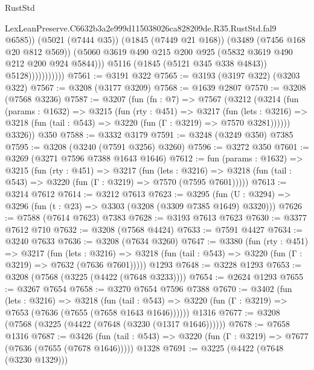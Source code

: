 \begin{lexlean}{RustStd}
\begin{coremodule}
                                LexLeanPreserve.C6632b3a2e999d115038026ca828209de.R35.RustStd.fal9
                                @6585))
                            (@5021 (@7444 @35))
                            (@1845 (@7449 @21 @168))
                            (@3489 (@7456 @168 @20 @812 @569))
                            (@5060
                              @3619
                              @490
                              @215
                              @200
                              @925
                              (@5832 @3619 @490 @212 @200 @924 @5844)))
                          @5116
                          (@1845 (@5121 @345 @338 @4843))
                          @5128)))))))))))
@7561 := @3191 @322
@7565 := @3193 (@3197 @322) (@3203 @322)
@7567 := @3208 (@3177 @3209)
@7568 := @1639 @2807
@7570 := @3208 (@7568 @3236)
@7587 := @3207
    (fun (fn : @7) =>
    @7567
      (@3212
        (@3214
          (fun (params : @1632) =>
          @3215
            (fun (rty : @451) =>
            @3217
              (fun (lets : @3216) =>
              @3218 (fun (tail : @543) => @3220 (fun (Γ : @3219) => @7570 @3281))))))
        @3326))
    @350
@7588 := @3332 @3179
@7591 := @3248 (@3249 @350) @7385
@7595 := @3208 (@3240 (@7591 @3256) @3260)
@7596 := @3272 @350
@7601 := @3269 (@3271 @7596 @7388 @1643 @1646)
@7612 := fun (params : @1632) =>
  @3215
    (fun (rty : @451) =>
    @3217
      (fun (lets : @3216) =>
      @3218 (fun (tail : @543) => @3220 (fun (Γ : @3219) => @7570 (@7595 @7601)))))
@7613 := @3214 @7612
@7614 := @3212 @7613
@7623 := @3295 (fun (U : @3294) => @3296 (fun (t : @23) => @3303 (@3208 (@3309 @7385 @1649) @3320)))
@7626 := @7588 (@7614 @7623) @7383
@7628 := @3193 @7613 @7623
@7630 := @3377 @7612 @710
@7632 := @3208 (@7568 @4424)
@7633 := @7591 @4427
@7634 := @3240 @7633
@7636 := @3208 (@7634 @3260)
@7647 := @3380
    (fun (rty : @451) =>
    @3217
      (fun (lets : @3216) =>
      @3218 (fun (tail : @543) => @3220 (fun (Γ : @3219) => @7632 (@7636 @7601)))))
    @1293
@7648 := @3228 @1293
@7653 := @3208 (@7568 (@3225 (@4422 (@7648 @3233))))
@7654 := @2624 @1293
@7655 := @3267 @7654
@7658 := @3270 @7654 @7596 @7388
@7670 := @3402
    (fun (lets : @3216) =>
    @3218
      (fun (tail : @543) => @3220 (fun (Γ : @3219) => @7653 (@7636 (@7655 (@7658 @1643 @1646))))))
    @1316
@7677 := @3208 (@7568 (@3225 (@4422 (@7648 (@3230 (@1317 @1646))))))
@7678 := @7658 @1316
@7687 := @3426
    (fun (tail : @543) => @3220 (fun (Γ : @3219) => @7677 (@7636 (@7655 (@7678 @1646)))))
    @1328
@7691 := @3225 (@4422 (@7648 (@3230 @1329)))

\end{coremodule}
\end{lexlean}
